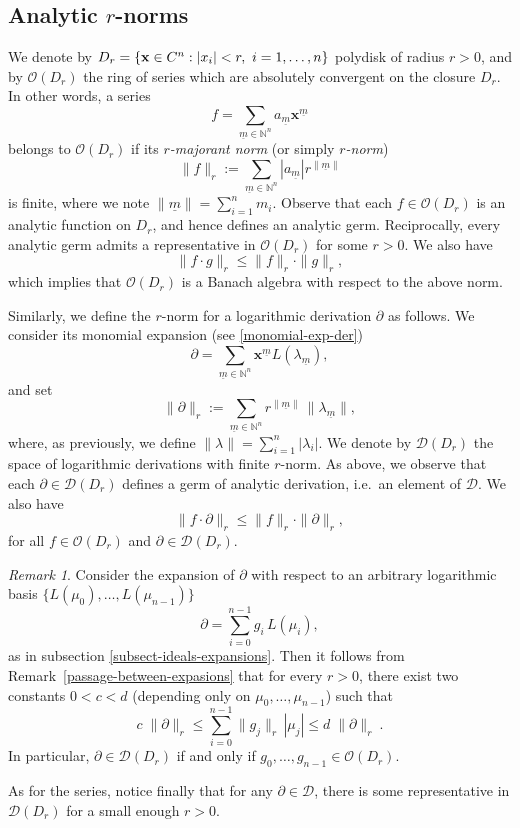 \documentclass[10pt,twoside,reqno]{amsart}
\theoremstyle{remark}
\theoremstyle{remark}
\newtheorem{remark}[thm]{Remark}
\newcommand{\N}{\mathbb{N}}
\newcommand{\C}{\mathbb{C}}
\newcommand{\OO}{\mathcal{O}}
\newcommand{\um}{{\underline m}}
\newcommand{\x}{\mathbf{x}}
\newcommand{\oO}{\mathcal{O}}
\newcommand{\cD}{\mathcal{D}}
\begin{document}
\subsection{Analytic $r$-norms}\label{subsect-analytic-norms}
We denote by $D_r = \{\x\in \mathbb \C^n: |x_i|<r, \ i=1,\ldots, n\}$ polydisk of radius $r>0$, and by $\OO(D_r)$ the ring of series which are absolutely convergent on the closure $D_r$. In other words, a series  
	$$ f= \sum_{\um\in \N^n} a_{\um} \x^{\um}  $$
	belongs to $\OO(D_r)$ if its {\em $r$-majorant norm} (or simply {\em $r$-norm}) 
    $$\| f\|_r:=\sum_{\um \in \N^n} |a_{\um }| r^{\|\um\|}$$ 
    is finite, where we note $\|\um \| = \sum_{i=1}^n m_i$. Observe that each $f \in \OO(D_r)$ is an analytic function on $D_r$, and hence defines an analytic germ. Reciprocally, every analytic germ admits a representative in $\oO(D_r)$ for some $r>0$. We also have
    $$
    \| f \cdot g \|_r \le \| f \|_r \cdot \| g\|_r,
    $$ 
which implies that $\OO(D_r)$ is a Banach algebra with respect to the above norm. 

    Similarly, we define the $r$-norm for a logarithmic derivation $\partial$ as follows. We consider its monomial expansion (see \eqref{monomial-exp-der})
   $$
   \partial = \sum_{\um\in \N^n} \x^{\um} L(\lambda_{\um}),$$
   and set 
   $$
   \|\partial\|_r := \sum_{\um \in \N^n}r^{\|\um \|} \, \|\lambda_{\um}\|,
   $$
   where, as previously, we define $\| \lambda \| = \sum_{i=1}^n |\lambda_i|$. We denote by $\cD(D_r)$ the space of logarithmic derivations with finite $r$-norm. As above, we observe that each $\partial \in \cD(D_r)$ defines a germ of analytic derivation, i.e.~an element of $\cD$.  We also have
 $$
    \| f \cdot \partial \|_r \le \| f \|_r \cdot \| \partial \|_r,
 $$
 for all $f \in \oO(D_r)$ and $\partial \in \cD(D_r)$.  %
\begin{remark}\label{remark-norm-logarithmic-components}
Consider the expansion of $\partial$ with respect to an arbitrary logarithmic basis $\{L(\mu_0),\ldots,L(\mu_{n-1})\}$  
$$\partial = \sum_{i=0}^{n-1} g_i\, L(\mu_i),$$
as in subsection \ref{subsect-ideals-expansions}. Then it follows from Remark~\ref{passage-between-expasions} that for every $r>0$, there exist two constants $0<c<d$ (depending only on $\mu_0,\ldots,\mu_{n-1}$) such that
   $$c\;  \|\partial \|_r\leq \sum_{i=0}^{n-1}\|g_j\|_r \, |\mu_j|  \leq d\; \|  \partial \|_r\ . $$
In particular,  $\partial \in \cD(D_r)$ if and only if $g_0,\ldots,g_{n-1} \in \oO(D_r)$.
 \end{remark}
As for the series, notice finally that for any $\partial \in \mathcal D$, there is some representative in $\mathcal D (D_r)$ for a small enough $r>0$.
\end{document}
